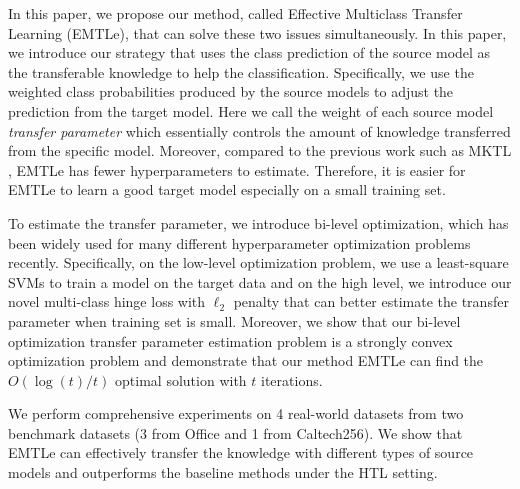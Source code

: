 In this paper, we propose our method, {called Effective Multiclass Transfer Learning (EMTLe)}, that can solve these two issues simultaneously. 
In this paper, we introduce our strategy that uses the class prediction of the source model as the transferable knowledge to help the classification. Specifically, we use the weighted class probabilities produced by the source models to adjust the prediction from the target model. Here we call the weight of each source model \textit{transfer parameter} which essentially controls the amount of knowledge transferred from the specific model. Moreover, compared to the previous work such as MKTL \cite{jie2011multiclass}, EMTLe has fewer hyperparameters to estimate. Therefore, it is easier for EMTLe to learn a good target model especially on a small training set. %


To estimate the transfer parameter, we introduce bi-level optimization\cite{Pedregosa16}, which has been widely used for many different hyperparameter optimization problems recently. Specifically, on the low-level optimization problem, we use a least-square SVMs to train a model on the target data and on the high level, we introduce our novel multi-class hinge loss with $\ell_2$ penalty that can better estimate the transfer parameter when training set is small. Moreover, we show that our bi-level optimization transfer parameter estimation problem is a strongly convex optimization problem and demonstrate that our method EMTLe can find the $O({\log(t)}/{t})$ optimal solution with $t$ iterations. 

We perform comprehensive experiments on 4 real-world datasets from two benchmark datasets (3 from Office and 1 from Caltech256). We show that EMTLe can effectively transfer the knowledge with different types of source models and outperforms the baseline methods under the HTL setting. %

